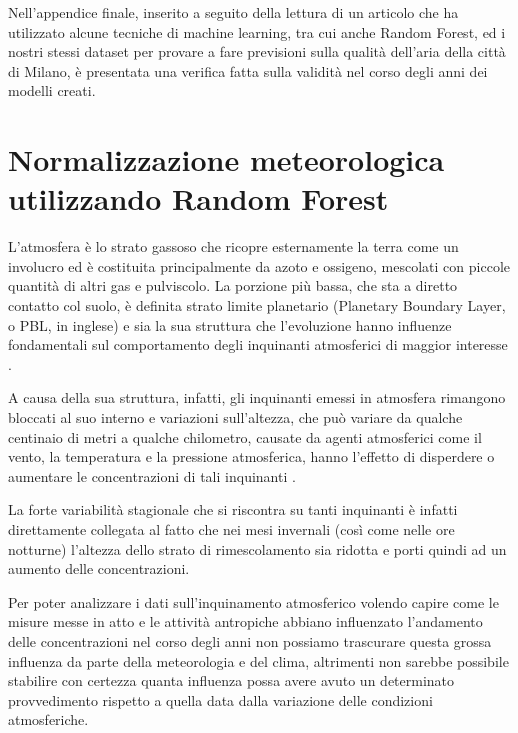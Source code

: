 Nell'appendice finale, inserito a seguito della lettura di un articolo \cite{app10134587} che ha utilizzato alcune tecniche di machine learning, tra cui anche Random Forest, ed i nostri stessi dataset per provare a fare previsioni sulla qualità dell'aria della città di Milano, è presentata una verifica fatta sulla validità nel corso degli anni dei modelli creati.


\chapter{Normalizzazione meteorologica utilizzando Random Forest}
L'atmosfera è lo strato gassoso che ricopre esternamente la terra come un involucro ed è costituita principalmente da azoto e ossigeno, mescolati con piccole quantità di altri gas e pulviscolo. La porzione più bassa, che sta a diretto contatto col suolo, è definita strato limite planetario (Planetary Boundary Layer, o PBL, in inglese) e sia la sua struttura che l'evoluzione hanno influenze fondamentali sul comportamento degli inquinanti atmosferici di maggior interesse \cite{dina2009concentrazione}.  

A causa della sua struttura, infatti, gli inquinanti emessi in atmosfera rimangono bloccati al suo interno e variazioni sull'altezza, che può variare da qualche centinaio di metri a qualche chilometro, causate da agenti atmosferici come il vento, la temperatura e la pressione atmosferica, hanno l'effetto di disperdere o aumentare le concentrazioni di tali inquinanti \cite{stull2012introduction}.  

La forte variabilità stagionale che si riscontra su tanti inquinanti è infatti direttamente collegata al fatto che nei mesi invernali (così come nelle ore notturne) l'altezza dello strato di rimescolamento sia ridotta e porti quindi ad un aumento delle concentrazioni.  

Per poter analizzare i dati sull'inquinamento atmosferico volendo capire come le misure messe in atto e le attività antropiche abbiano influenzato l'andamento delle concentrazioni nel corso degli anni non possiamo trascurare questa grossa influenza da parte della meteorologia e del clima, altrimenti non sarebbe possibile stabilire con certezza quanta influenza possa avere avuto un determinato provvedimento rispetto a quella data dalla variazione delle condizioni atmosferiche.  

